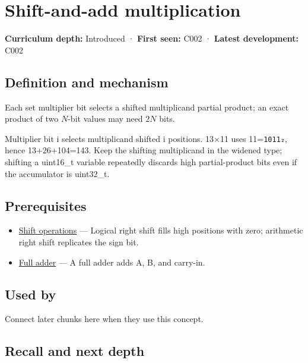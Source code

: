\hypertarget{appendix-a65290d66ed9}{}\label{referencestart:appendix-a65290d66ed9}
\section{Shift-and-add multiplication}\label{appendix-a65290d66ed9-shift-and-add-multiplication}

\textbf{Curriculum depth:} Introduced · \textbf{First seen:} C002 · \textbf{Latest development:} C002

\subsection{Definition and mechanism}\label{appendix-a65290d66ed9-definition-and-mechanism}

Each set multiplier bit selects a shifted multiplicand partial product; an exact product of two \(N\)-bit values may need \(2N\) bits.

Multiplier bit i selects multiplicand shifted i positions. 13×11 uses 11=\texttt{1011₂}, hence 13+26+104=143. Keep the shifting multiplicand in the widened type; shifting a uint16\_t variable repeatedly discards high partial-product bits even if the accumulator is uint32\_t.

\subsection{Prerequisites}\label{appendix-a65290d66ed9-prerequisites}

\begin{itemize}
\tightlist
\item
  \hyperref[appendix-73425b25118e]{Shift operations} --- Logical right shift fills high positions with zero; arithmetic right shift replicates the sign bit.
\item
  \hyperref[appendix-d1a5b1e520c2]{Full adder} --- A full adder adds A, B, and carry-in.
\end{itemize}

\subsection{Used by}\label{appendix-a65290d66ed9-used-by}

Connect later chunks here when they use this concept.

\subsection{Recall and next depth}\label{appendix-a65290d66ed9-recall-and-next-depth}

